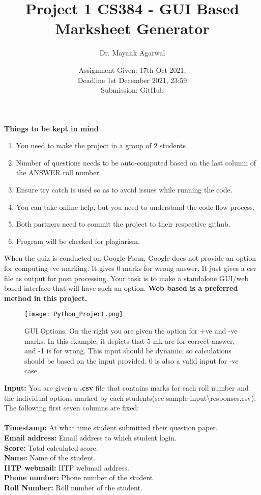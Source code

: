 \documentclass{article}
\title{Project 1 CS384 -   GUI Based Marksheet Generator}
\author{Dr. Mayank Agarwal}
\date{Assignment Given: 17th Oct 2021,\\ Deadline 1st December 2021,  
23:59\\Submission: GitHub }
\begin{document}
	\maketitle  
	\textbf{Things to be kept in mind} 
	\begin{enumerate}
\item You need to make the project in a group of 2 students
\item Number of questions needs to be auto-computed based on the last 
column of the ANSWER roll number. 	

\item Ensure try catch is used so as to avoid issues while running the code. 

\item You can take online help, but you need to understand the code flow 
process.

\item Both partners need to commit the project to their respective github. 
\item Program will be checked for plagiarism.   
\end{enumerate}

When the quiz is conducted on Google Form, Google does not provide an option 
for computing -ve marking. It gives 0 marks for wrong answer. It just gives a 
csv file as output for post 
processing. Your task is to make a standalone GUI/web based interface that will 
have such an option. \textbf{Web based is a preferred method in this project. }

\begin{figure}
	\centering
	\texttt{[image: Python\_Project.png]}
	\caption{GUI Options. On the right you are given the option for +ve and -ve 
	marks. In this example, it depicts that 5 mk are for correct answer, and -1 
	is for wrong. This input  should be dynamic, so calculations should be 
	based on the input provided. 0 is also a valid input for -ve case.}
	\label{fig:marksheet_project}
\end{figure}

\textbf{Input:}
You are given a \textbf{.csv} file that contains marks for each roll number and 
the individual options marked by each students(see sample 
input\textbackslash responses.csv). The 
following first seven 
columns are fixed: \\
\\
\textbf{Timestamp:}	At what time student submitted their question paper.\\
\textbf{Email address:}	Email address to which student login.\\       
\textbf{Score:}	Total calculated score.\\
\textbf{Name:}	Name of the student.\\
\textbf{IITP webmail:}	IITP webmail address.\\
\textbf{Phone number:} Phone number of the student\\
\textbf{Roll Number:} Roll number of the student.\\
\end{document}
